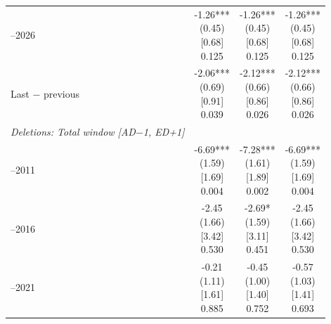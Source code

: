 \begin{threeparttable}
\begin{tabular}{@{}lccc}
\addlinespace[0.25ex]
\addlinespace[0.25ex]
2022–2026 & \makecell{-1.26***\\(0.45)\\{}[0.68]\\{0.125}} & \makecell{-1.26***\\(0.45)\\{}[0.68]\\{0.125}} & \makecell{-1.26***\\(0.45)\\{}[0.68]\\{0.125}} \\
\addlinespace[0.25ex]
\addlinespace[0.25ex]
Last $-$ previous & \makecell{-2.06***\\(0.69)\\{}[0.91]\\{0.039}} & \makecell{-2.12***\\(0.66)\\{}[0.86]\\{0.026}} & \makecell{-2.12***\\(0.66)\\{}[0.86]\\{0.026}} \\
\addlinespace[0.25ex]
\midrule
\emph{Deletions: Total window [AD$-$1, ED+1]} \\
\addlinespace[0.25ex]
\addlinespace[1ex]
2007–2011 & \makecell{-6.69***\\(1.59)\\{}[1.69]\\{0.004}} & \makecell{-7.28***\\(1.61)\\{}[1.89]\\{0.002}} & \makecell{-6.69***\\(1.59)\\{}[1.69]\\{0.004}} \\
\addlinespace[0.25ex]
\addlinespace[0.25ex]
2012–2016 & \makecell{-2.45\\(1.66)\\{}[3.42]\\{0.530}} & \makecell{-2.69*\\(1.59)\\{}[3.11]\\{0.451}} & \makecell{-2.45\\(1.66)\\{}[3.42]\\{0.530}} \\
\addlinespace[0.25ex]
\addlinespace[0.25ex]
2017–2021 & \makecell{-0.21\\(1.11)\\{}[1.61]\\{0.885}} & \makecell{-0.45\\(1.00)\\{}[1.40]\\{0.752}} & \makecell{-0.57\\(1.03)\\{}[1.41]\\{0.693}} \\

\end{tabular}
\end{threeparttable}

